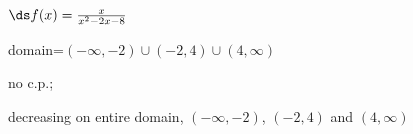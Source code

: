 {$\ds f(x) =\frac{x}{x^2-2x-8}$
}
{domain=$(-\infty,-2)\cup(-2,4)\cup(4,\infty)$

no c.p.; 

decreasing on entire domain, $(-\infty,-2)$, $(-2,4)$ and $(4,\infty)$
}

